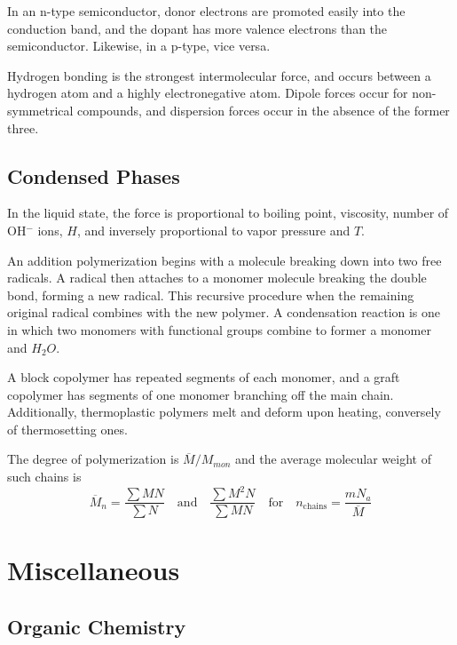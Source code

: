 \documentclass{tufte-book}
\begin{document}
\bigskip
In an n-type semiconductor, donor electrons are promoted easily into the conduction band, and the dopant has more valence electrons than the semiconductor. Likewise, in a p-type, vice versa.

\bigskip
Hydrogen bonding is the strongest intermolecular force, and occurs between a hydrogen atom and a highly electronegative atom. Dipole forces occur for non-symmetrical compounds, and dispersion forces occur in the absence of the former three.

\section{Condensed Phases}
In the liquid state, the force is proportional to boiling point, viscosity, number of OH$^-$ ions, $H$, and inversely proportional to vapor pressure and $T$.

\bigskip
An addition polymerization begins with a molecule breaking down into two free radicals. A radical then attaches to a monomer molecule breaking the double bond, forming a new radical. This recursive procedure when the remaining original radical combines with the new polymer. A condensation reaction is one in which two monomers with functional groups combine to former a monomer and $H_2O$.

\bigskip
A block copolymer has repeated segments of each monomer, and a graft copolymer has segments of one monomer branching off the main chain. Additionally, thermoplastic polymers melt and deform upon heating, conversely of thermosetting ones.

\bigskip
The degree of polymerization is $\overline M / M_{mon}$ and the average molecular weight of such chains is
\begin{equation}
  \overline M_n = \frac{\sum MN}{\sum N} \quad\text{and}\quad \frac{\sum M^2 N}{\sum MN} \quad\text{for}\quad n_{\mathrm{chains}} = \frac{m N_a}{\overline M}
\end{equation}

\chapter{Miscellaneous}

\section{Organic Chemistry}
\end{document}
